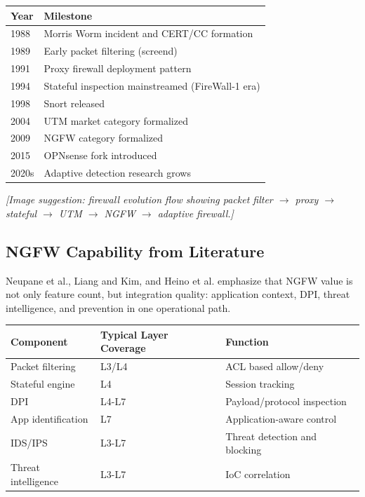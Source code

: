 \documentclass[12pt,a4paper]{article}
\begin{document}
\begin{table}[h!]
\centering
\begin{tabular}{ll}
\toprule
Year & Milestone \\
\midrule
1988 & Morris Worm incident and CERT/CC formation \\
1989 & Early packet filtering (screend) \\
1991 & Proxy firewall deployment pattern \\
1994 & Stateful inspection mainstreamed (FireWall-1 era) \\
1998 & Snort released \\
2004 & UTM market category formalized \\
2009 & NGFW category formalized \\
2015 & OPNsense fork introduced \\
2020s & Adaptive detection research grows \\
\bottomrule
\end{tabular}
\end{table}

\textit{[Image suggestion: firewall evolution flow showing packet filter $\rightarrow$ proxy $\rightarrow$ stateful $\rightarrow$ UTM $\rightarrow$ NGFW $\rightarrow$ adaptive firewall.]}

\subsection{NGFW Capability from Literature}

Neupane et al., Liang and Kim, and Heino et al. emphasize that NGFW value is not only feature count, but integration quality: application context, DPI, threat intelligence, and prevention in one operational path.

\begin{table}[h!]
\centering
\begin{tabular}{lll}
\toprule
Component & Typical Layer Coverage & Function \\
\midrule
Packet filtering & L3/L4 & ACL based allow/deny \\
Stateful engine & L4 & Session tracking \\
DPI & L4-L7 & Payload/protocol inspection \\
App identification & L7 & Application-aware control \\
IDS/IPS & L3-L7 & Threat detection and blocking \\
Threat intelligence & L3-L7 & IoC correlation \\
\bottomrule
\end{tabular}
\end{table}
\end{document}
